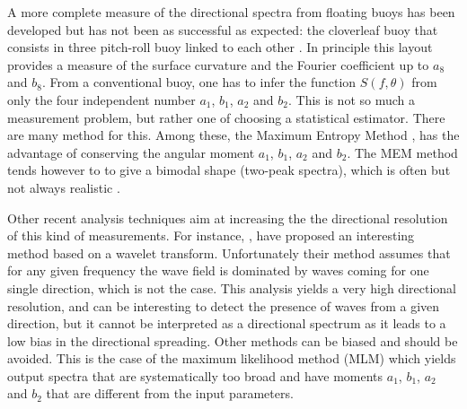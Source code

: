 A more complete measure of the directional spectra from floating buoys has been developed but has not been as successful as expected: the cloverleaf buoy that consists in three 
pitch-roll buoy linked to each other \citep{Mitsuyasu&al.1975}. In principle this layout provides a measure of the surface curvature and the Fourier coefficient up to $a_8$ and $b_8$.
From a conventional buoy, one has to infer the function $S(f,\theta)$ from only the four independent number $a_1$, $b_1$, $a_2$ and $b_2$. This is not so much a 
measurement problem, but rather one of choosing a statistical estimator. There are many method for this. Among these, the Maximum Entropy Method \citep[MEM][]{Lygre&Krogstad1986}, 
has the advantage of conserving the angular moment  $a_1$, $b_1$, $a_2$ and $b_2$. The MEM method tends however to 
to give a bimodal shape (two-peak spectra), which is often \citep{Ewans1998} but not always realistic \citep{Benoit&al.1997}.

Other recent analysis techniques aim at increasing the the directional resolution of this kind of measurements. For instance, \cite{Donelan&al.1996}, 
have proposed an interesting method based on a wavelet transform. Unfortunately their method assumes that for any given frequency 
the wave field is dominated by waves coming for one single direction, which is not the case. This analysis yields a very high directional resolution, and can be interesting 
to detect the presence of waves from a given direction, but it cannot be interpreted as a directional spectrum as it leads to a low bias in the directional spreading. Other methods can be biased and 
should be avoided. This is 
the case of the maximum likelihood method (MLM) which yields output spectra that are systematically too broad and have moments $a_1$, $b_1$, $a_2$ and $b_2$ that 
are different from the input parameters.
 
